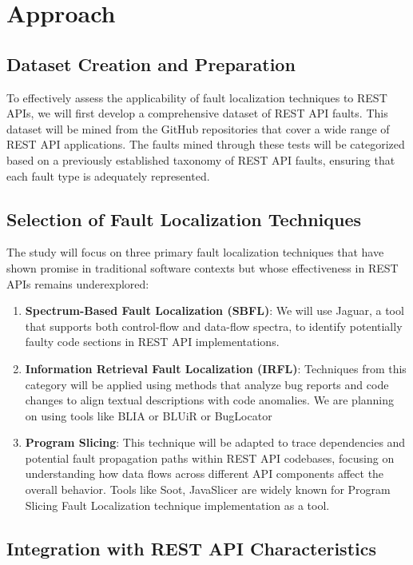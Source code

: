 \documentclass[conference]{IEEEtran}
\begin{document}
\section{Approach}
\label{sec:approach}

\subsection{Dataset Creation and Preparation}

To effectively assess the applicability of fault localization techniques to REST APIs, we will first develop a comprehensive dataset of REST API faults. This dataset will be mined from the GitHub repositories  that cover a wide range of REST API applications. 
The faults mined through these tests will be categorized based on a previously established taxonomy of REST API faults, ensuring that each fault type is adequately represented.

\subsection{Selection of Fault Localization Techniques}

The study will focus on three primary fault localization techniques that have shown promise in traditional software contexts but whose effectiveness in REST APIs remains underexplored:
\begin{enumerate}
    \item \textbf{Spectrum-Based Fault Localization (SBFL)}: We will use Jaguar, a tool that supports both control-flow and data-flow spectra, to identify potentially faulty code sections in REST API implementations.
    \item \textbf{Information Retrieval Fault Localization (IRFL)}: Techniques from this category will be applied using methods that analyze bug reports and code changes to align textual descriptions with code anomalies. We are planning on using tools like BLIA or BLUiR or BugLocator
    \item \textbf{Program Slicing}: This technique will be adapted to trace dependencies and potential fault propagation paths within REST API codebases, focusing on understanding how data flows across different API components affect the overall behavior. Tools like Soot, JavaSlicer are widely known for Program Slicing Fault Localization technique implementation as a tool.
\end{enumerate}

\subsection{Integration with REST API Characteristics}
\end{document}

